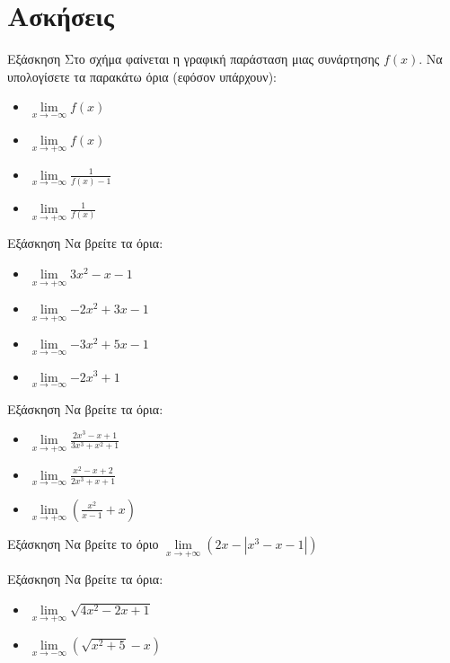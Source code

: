 \documentclass[greek]{beamer}
\begin{document}
\section{Ασκήσεις}
\begin{frame}{Εξάσκηση}
 Στο σχήμα
 \href{https://www.geogebra.org/m/p9xmedm8}{}
 φαίνεται η γραφική παράσταση μιας συνάρτησης $f(x)$. Να υπολογίσετε τα παρακάτω όρια (εφόσον υπάρχουν):
 \begin{itemize}
  \item $\lim\limits_{x \to -\infty}{ f(x) }$ \pause
  \item $\lim\limits_{x \to +\infty}{ f(x) }$ \pause
  \item $\lim\limits_{x \to -\infty}{ \frac{1}{f(x)-1} }$ \pause
  \item $\lim\limits_{x \to +\infty}{ \frac{1}{f(x)} }$
 \end{itemize}
\end{frame}

\begin{frame}{Εξάσκηση}
 Να βρείτε τα όρια:
 \begin{itemize}
  \item $\lim\limits_{x \to +\infty}{ 3x^2-x-1 }$ \pause
  \item $\lim\limits_{x \to +\infty}{ -2x^2+3x-1 }$ \pause
  \item $\lim\limits_{x \to -\infty}{ -3x^2+5x-1 }$ \pause
  \item $\lim\limits_{x \to -\infty}{ -2x^3+1 }$
 \end{itemize}
\end{frame}

\begin{frame}{Εξάσκηση}
 Να βρείτε τα όρια:
 \begin{itemize}
  \item $\lim\limits_{x \to +\infty}{ \frac{2x^3-x+1}{3x^3+x^2+1} }$ \pause
  \item $\lim\limits_{x \to -\infty}{ \frac{x^2-x+2}{2x^3+x+1} }$ \pause
  \item $\lim\limits_{x \to +\infty}{ \left( \frac{x^2}{x-1}+x  \right)  }$
 \end{itemize}
\end{frame}

\begin{frame}{Εξάσκηση}
 Να βρείτε το όριο $\lim\limits_{x \to +\infty}{ \left( 2x-|x^3-x-1| \right)  }$
\end{frame}

\begin{frame}{Εξάσκηση}
 Να βρείτε τα όρια:
 \begin{itemize}
  \item $\lim\limits_{x \to +\infty}{ \sqrt{4x^2-2x+1} }$ \pause
  \item $\lim\limits_{x \to -\infty}{ \left( \sqrt{x^2+5} -x \right)  }$
 \end{itemize}
\end{frame}
\end{document}
